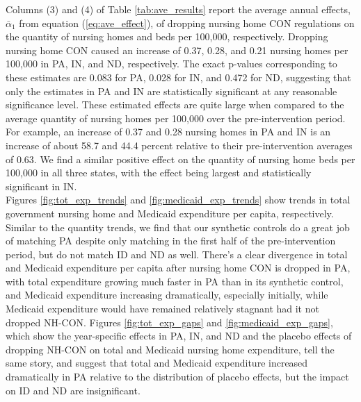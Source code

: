 \documentclass[../Main.tex]{subfiles}
\begin{document}
\indent Columns (3) and (4) of Table \ref{tab:ave_results} report the average annual effects, $\bar{\alpha}_1$ from equation (\ref{eq:ave_effect}), of dropping nursing home CON regulations on the quantity of nursing homes and beds per 100,000, respectively. Dropping nursing home CON caused an increase of 0.37, 0.28, and 0.21 nursing homes per 100,000 in PA, IN, and ND, respectively. The exact p-values corresponding to these estimates are 0.083 for PA, 0.028 for IN, and 0.472 for ND, suggesting that only the estimates in PA and IN are statistically significant at any reasonable significance level. These estimated effects are quite large when compared to the average quantity of nursing homes per 100,000 over the pre-intervention period. For example, an increase of 0.37 and 0.28 nursing homes in PA and IN is an increase of about 58.7 and 44.4 percent relative to their pre-intervention averages of 0.63. We find a similar positive effect on the quantity of nursing home beds per 100,000 in all three states, with the effect being largest and statistically significant in IN.\\
\indent Figures \ref{fig:tot_exp_trends} and \ref{fig:medicaid_exp_trends} show trends in total government nursing home and Medicaid expenditure per capita, respectively. Similar to the quantity trends, we find that our synthetic controls do a great job of matching PA despite only matching in the first half of the pre-intervention period, but do not match ID and ND as well. There's a clear divergence in total and Medicaid expenditure per capita after nursing home CON is dropped in PA, with total expenditure growing much faster in PA than in its synthetic control, and Medicaid expenditure increasing dramatically, especially initially, while Medicaid expenditure would have remained relatively stagnant had it not dropped NH-CON. Figures \ref{fig:tot_exp_gaps} and \ref{fig:medicaid_exp_gaps}, which show the year-specific effects in PA, IN, and ND and the placebo effects of dropping NH-CON on total and Medicaid nursing home expenditure, tell  the same story, and suggest that total and Medicaid expenditure increased dramatically in PA relative to the distribution of placebo effects, but the impact on ID and ND are insignificant.\\
\end{document}
